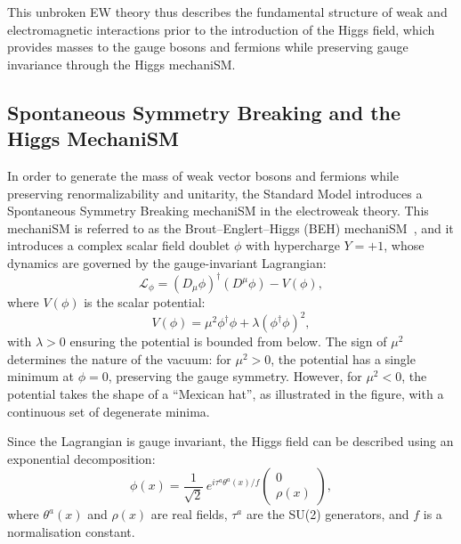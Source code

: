 \documentclass[11pt,twoside]{book}
\begin{document}
This unbroken EW theory thus describes the fundamental structure of weak and electromagnetic interactions prior to the introduction of the Higgs field, which provides masses to the gauge bosons and fermions while preserving gauge invariance through the Higgs mechani\acrshort{SM}.



\subsection{Spontaneous Symmetry Breaking and the Higgs Mechani\acrshort{SM}}
\label{subsec:higgs_mech}

In order to generate the mass of weak vector bosons and fermions while preserving renormalizability and unitarity, the Standard Model introduces a Spontaneous Symmetry Breaking mechani\acrshort{SM} in the electroweak theory. 
This mechani\acrshort{SM} is referred to as the Brout–Englert–Higgs (BEH) mechani\acrshort{SM}~\cite{Brout:1964,Higgs:1964}, and it introduces a complex scalar field doublet $\phi$ with hypercharge $Y = +1$, whose dynamics are governed by the gauge-invariant Lagrangian:
\begin{equation}
\mathcal{L}_\phi = (D_\mu \phi)^\dagger(D^\mu \phi) - V(\phi),
\end{equation}
where $V(\phi)$ is the scalar potential:
\begin{equation}
V(\phi) = \mu^2 \phi^\dagger \phi + \lambda(\phi^\dagger \phi)^2,
\label{eq:higgs_potential}
\end{equation}
with $\lambda > 0$ ensuring the potential is bounded from below. The sign of $\mu^2$ determines the nature of the vacuum: for $\mu^2 > 0$, the potential has a single minimum at $\phi = 0$, preserving the gauge symmetry. However, for $\mu^2 < 0$, the potential takes the shape of a “Mexican hat”, as illustrated in the figure, with a continuous set of degenerate minima.

Since the Lagrangian is gauge invariant, the Higgs field can be described using an exponential decomposition:
\begin{equation}
\phi(x) = \frac{1}{\sqrt{2}} \, e^{i \tau^a \theta^a(x)/f} \begin{pmatrix}
0 \\
\rho(x)
\end{pmatrix},
\label{eq:higgs_param}
\end{equation}
where $\theta^a(x)$ and $\rho(x)$ are real fields, $\tau^a$ are the SU(2) generators, and $f$ is a normalisation constant.
\end{document}
